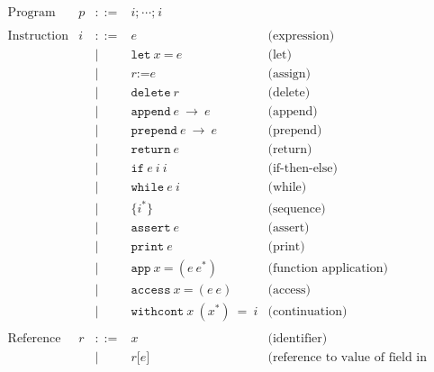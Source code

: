 \documentclass[11pt]{article}
\newcommand{\Term}[1]{\texttt{#1}}
\begin{document}
\[
\begin{array}{rrrll}
\text{Program} & p & ::= & i\Term{;}\ \cdots \Term{;}\ i & \\
\\

\text{Instruction} & i & ::= & e & \text{(expression)} \\
&&|& \Term{let}\ x\ \Term{=}\ e & \text{(let)}\\
&&|& r \Term{:=} e & \text{(assign)}\\
&&|& \Term{delete}\ r & \text{(delete)}\\
&&|& \Term{append}\ e\ \to\ e & \text{(append)}\\
&&|& \Term{prepend}\ e\ \to\ e & \text{(prepend)}\\
&&|& \Term{return}\ e & \text{(return)}\\
&&|& \Term{if}\ e\ i\ i\ & \text{(if-then-else)}\\
&&|& \Term{while}\ e\ i & \text{(while)}\\
&&|& \{ i^* \} & \text{(sequence)}\\
&&|& \Term{assert}\ e & \text{(assert)}\\
&&|& \Term{print}\ e & \text{(print)}\\
&&|& \Term{app}\ x\ \Term{=}\ (e\ e^*) & \text{(function application)}\\
&&|& \Term{access}\ x\ \Term{=}\ (e\ e) & \text{(access)}\\
&&|& \Term{withcont}\ x\ (x^*)\ =\ i & \text{(continuation)}\\ 
\\

\text{Reference} & r & ::= & x & \text{(identifier)}\\
&&|& r\Term{[} e \Term{]} & \text{(reference to value of field in heap)}\\
\\
\end{array}
\]

\newpage
\end{document}
